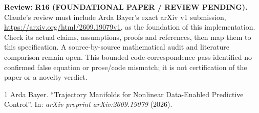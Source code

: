 \documentclass[11pt]{article}
\newcommand{\review}[1]{\par\noindent\textcolor{red!70!black}{\textbf{Review:} #1}\par}
\begin{document}
\review{\textbf{R16 (FOUNDATIONAL PAPER / REVIEW PENDING).} Claude's review must include Arda Bayer's exact arXiv v1 submission, \url{https://arxiv.org/html/2609.19079v1}, as the foundation of this implementation. Check its actual claims, assumptions, proofs and references, then map them to this specification. A source-by-source mathematical audit and literature comparison remain open. This bounded code-correspondence pass identified no confirmed false equation or prose/code mismatch; it is not certification of the paper or a novelty verdict.}
\begin{thebibliography}{1}
 Arda Bayer. ``Trajectory Manifolds for Nonlinear Data-Enabled Predictive Control''. In: \emph{arXiv preprint arXiv:2609.19079} (2026).
\end{thebibliography}
\end{document}
